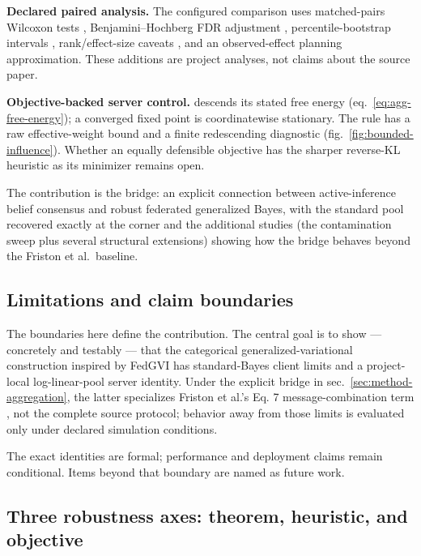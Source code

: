 \documentclass[
  english,
]{article}
\theoremstyle{plain}
\theoremstyle{definition}
\theoremstyle{remark}
\theoremstyle{definition}
\begin{document}
\textbf{Declared paired analysis.} The configured comparison uses
matched-pairs Wilcoxon tests
\citep{wilcoxon1945individual, fay2010wilcoxon}, Benjamini--Hochberg FDR
adjustment \citep{benjamini1995controlling}, percentile-bootstrap
intervals \citep{efron1993bootstrap}, rank/effect-size caveats
\citep{nakagawa2007effect}, and an observed-effect planning
approximation. These additions are project analyses, not claims about
the source paper.

\textbf{Objective-backed server control.}
 descends its stated free energy
(eq.~\ref{eq:agg-free-energy}); a converged fixed point is
coordinatewise stationary. The rule has a raw effective-weight bound and
a finite redescending diagnostic (fig.~\ref{fig:bounded-influence}).
Whether an equally defensible objective has the sharper reverse-KL
heuristic as its minimizer remains open.

The contribution is the bridge: an explicit connection between
active-inference belief consensus and robust federated generalized
Bayes, with the standard pool recovered exactly at the corner and the
additional studies (the contamination sweep plus several structural
extensions) showing how the bridge behaves beyond the Friston et
al.~baseline.

\subsection{Limitations and claim boundaries}\label{sec:limitations}

The boundaries here define the contribution. The central goal is to show
--- concretely and testably --- that the categorical
generalized-variational construction inspired by FedGVI
\citep{mildner2025fedgvi} has standard-Bayes client limits and a
project-local log-linear-pool server identity. Under the explicit bridge
in sec.~\ref{sec:method-aggregation}, the latter specializes Friston et
al.'s Eq. 7 message-combination term \citep{friston2024federated}, not
the complete source protocol; behavior away from those limits is
evaluated only under declared simulation conditions.

The exact identities are formal; performance and deployment claims
remain conditional. Items beyond that boundary are named as future work.

\subsection{Three robustness axes: theorem, heuristic, and
objective}\label{sec:limitations-axes}
\end{document}
